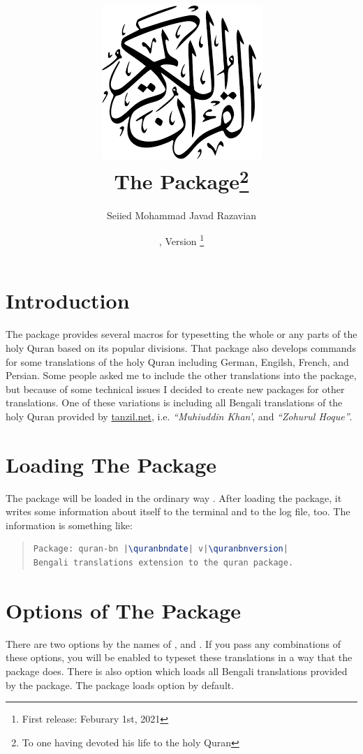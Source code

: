 \documentclass[a4paper]{ltxdoc}
\title{\includegraphics[scale=.3]{quran.png}\\
The \xpackage{quran-bn} Package\footnote{To one having devoted his life to the holy Quran}\\
}
\author{Seiied Mohammad Javad Razavian\\\xemail{javadr@gmail.com}}
\date{\quranbndate,  Version \quranbnversion\footnote{First release: Feburary 1st, 2021}}
\begin{document}
\maketitle

\tableofcontents

\section{Introduction}
The  package provides several macros for
typesetting the whole or any parts of the holy Quran based on its popular divisions. That package also develops
commands for some translations of the holy Quran including German, Engilsh, French, and Persian.
Some people asked me to include the other translations into the  package,
but because of some technical issues I decided to create new packages for other translations.
One of these variations is  including all Bengali translations of the holy Quran
provided by \url{tanzil.net}, i.e. \emph{``Muhiuddin Khan'}, and \emph{``Zohurul Hoque''}.


\section{Loading The Package}
The package will be loaded in the ordinary way
.
After loading the package, it writes some information about itself to the
terminal and to the log file, too. The information is something like:

\begin{quote}
\begin{lstlisting}[style=BashInputStyle, language=tex, escapechar={|}]
Package: quran-bn |\quranbndate| v|\quranbnversion|
Bengali translations extension to the quran package.
\end{lstlisting}
\end{quote}


\section{Options of The Package}\label{sec:qurantypesetting}
There are two options by the names of , and .
If you pass any combinations of these options, you will be enabled to typeset these translations in a way
that the  package does.
There is also  option which loads all Bengali translations provided by the  package.
The package loads  option by default.
\end{document}
